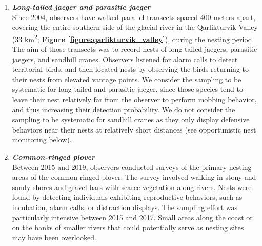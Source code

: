 \documentclass[a4paper,twoside,12pt]{article}
\begin{document}
\begin{enumerate}[label=\roman*]
        \item[] \textit{\textbf{Long-tailed jaeger and parasitic jaeger}} \\
        Since 2004, observers have walked parallel transects spaced 400 meters apart, covering the entire southern side of the glacial river in the Qarlikturvik Valley (33 km\textsuperscript{2}; \textbf{Figure \ref{figure:qarlikturvik_valley}}), during the nesting period. The aim of those transects was to record nests of long-tailed jaegers, parasitic jaegers, and sandhill cranes. Observers listened for alarm calls to detect territorial birds, and then located nests by observing the birds returning to their nests from elevated vantage points. We consider the sampling to be systematic for long-tailed and parasitic jaeger, since those species tend to leave their nest relatively far from the observer to perform mobbing behavior, and thus increasing their detection probability. We do not consider the sampling to be systematic for sandhill cranes as they only display defensive behaviors near their nests at relatively short distances (see opportunistic nest monitoring below).\\
        
        \item[] \textit{\textbf{Common-ringed plover}} \\
        Between 2015 and 2019, observers conducted surveys of the primary nesting areas of the common-ringed plover. The survey involved walking in stony and sandy shores and gravel bars with scarce vegetation along rivers. Nests were found by detecting individuals exhibiting reproductive behaviors, such as incubation, alarm calls, or distraction displays. The sampling effort was particularly intensive between 2015 and 2017. Small areas along the coast or on the banks of smaller rivers that could potentially serve as nesting sites may have been overlooked.\\
        

\end{enumerate}
\end{document}
